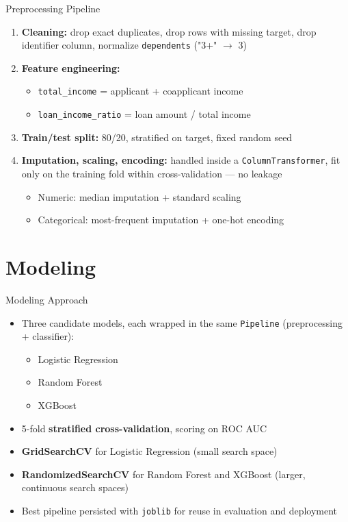 \documentclass[aspectratio=169]{beamer}
\begin{document}
\begin{frame}{Preprocessing Pipeline}
    \begin{enumerate}
        \item \textbf{Cleaning:} drop exact duplicates, drop rows with missing target, drop identifier column, normalize \texttt{dependents} ("3+" $\rightarrow$ 3)
        \item \textbf{Feature engineering:}
        \begin{itemize}
            \item \texttt{total\_income} = applicant + coapplicant income
            \item \texttt{loan\_income\_ratio} = loan amount / total income
        \end{itemize}
        \item \textbf{Train/test split:} 80/20, stratified on target, fixed random seed
        \item \textbf{Imputation, scaling, encoding:} handled inside a \texttt{ColumnTransformer}, fit only on the training fold within cross-validation --- no leakage
        \begin{itemize}
            \item Numeric: median imputation + standard scaling
            \item Categorical: most-frequent imputation + one-hot encoding
        \end{itemize}
    \end{enumerate}
\end{frame}

\section{Modeling}

\begin{frame}{Modeling Approach}
    \begin{itemize}
        \item Three candidate models, each wrapped in the same \texttt{Pipeline} (preprocessing + classifier):
        \begin{itemize}
            \item Logistic Regression
            \item Random Forest
            \item XGBoost
        \end{itemize}
        \item 5-fold \textbf{stratified cross-validation}, scoring on ROC AUC
        \item \textbf{GridSearchCV} for Logistic Regression (small search space)
        \item \textbf{RandomizedSearchCV} for Random Forest and XGBoost (larger, continuous search spaces)
        \item Best pipeline persisted with \texttt{joblib} for reuse in evaluation and deployment
    \end{itemize}
\end{frame}
\end{document}
